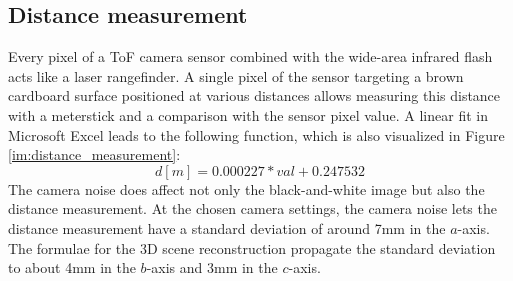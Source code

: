 \subsection{Distance measurement}
\label{sec:results_distance_meas}
Every pixel of a ToF camera sensor combined with the wide-area infrared flash acts like a laser rangefinder. A single pixel of the sensor targeting a brown cardboard surface positioned at various distances allows measuring this distance with a meterstick and a comparison with the sensor pixel value. A linear fit in Microsoft Excel leads to the following function, which is also visualized in Figure \ref{im:distance_measurement}:
\begin{equation*}
    d [m] = 0.000227 * val +0.247532
\end{equation*}
The camera noise does affect not only the black-and-white image but also the distance measurement. At the chosen camera settings, the camera noise lets the distance measurement have a standard deviation of around 7mm in the $a$-axis.\\
The formulae for the 3D scene reconstruction propagate the standard deviation to about 4mm in the $b$-axis and 3mm in the $c$-axis.
